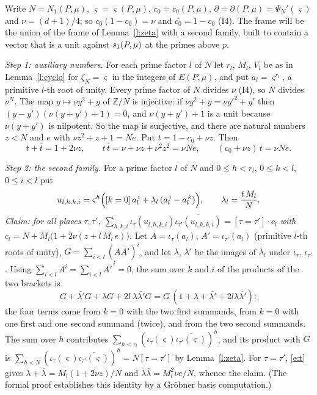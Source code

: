 \documentclass[11pt,a4paper]{article}
\makeatletter
\newcommand{\Z}{\mathbb{Z}}
\theoremstyle{plainx}
\theoremstyle{uprightx}
\renewenvironment{proof}[1][Proof]{\par\pushQED{\qed}\normalfont\topsep0pt\partopsep0pt
  \trivlist\item[\hskip\labelsep\itshape #1.]\ignorespaces}{\popQED\endtrivlist\@endpefalse}
\newcommand{\cj}[1]{\overline{#1}}
\newcommand{\EP}[2]{E(#1,#2)}
\newcommand{\Nn}[2]{N_1(#1,#2)}
\newcommand{\emb}[1]{\iota_{#1}}
\newcommand{\dgen}[2]{\partial(#1,#2)}
\newcommand{\rtu}[2]{\varsigma(#1,#2)}
\newcommand{\czE}[2]{c_0(#1,#2)}
\makeatother
\begin{document}
\begin{proof}[Proof of Theorem A]
Write $N=\Nn{P}{\mu}$, $\varsigma=\rtu{P}{\mu}$, $c_0=\czE{P}{\mu}$, $\partial=\dgen{P}{\mu}=\Psi_N'(\varsigma)$ and
$\nu=(d+1)/4$; so $c_0(1-c_0)=\nu$ and $\cj{c_0}=1-c_0$ (I4). The frame will be the union of the frame of
Lemma~\ref{l:zeta} with a second family, built to contain a vector that is a unit against $s_1(P,\mu)$ at the
primes above $p$.

\emph{Step 1: auxiliary numbers.} For each prime factor $l$ of $N$ let $r_l$, $M_l$, $V_l$ be as in
Lemma~\ref{l:cyclo} for $\zeta_N=\varsigma$ in the integers of $\EP{P}{\mu}$, and put $a_l=\varsigma^{r_l}$, a
primitive $l$-th root of unity. Every prime factor of $N$ divides $\nu$ (I4), so $N$ divides $\nu^N$. The map
$y\mapsto\nu y^2+y$ of $\Z/N$ is injective: if $\nu y^2+y=\nu y'^2+y'$ then $(y-y')(\nu(y+y')+1)=0$, and
$\nu(y+y')+1$ is a unit because $\nu(y+y')$ is nilpotent. So the map is surjective, and there are natural
numbers $z<N$ and $e$ with $\nu z^2+z+1=Ne$. Put $t=1-c_0+\nu z$. Then
\begin{equation}\label{e:t}
t+\cj t=1+2\nu z,\qquad t\,\cj t=\nu+\nu z+\nu^2z^2=\nu Ne,\qquad (c_0+\nu z)\,t=\nu Ne .
\end{equation}

\emph{Step 2: the second family.} For a prime factor $l$ of $N$ and $0\le h<r_l$, $0\le k<l$, $0\le i<l$ put
\[u_{l,h,k,i}=\varsigma^{h}\Bigl([k=0]\,a_l^{\,i}+\lambda_l\,(a_l^{\,i}-a_l^{\,k})\Bigr),\qquad\lambda_l=\frac{t\,M_l}{N} .\]
\emph{Claim: for all places $\tau,\tau'$,
$\sum_{h,k,i}\emb{\tau}(u_{l,h,k,i})\cj{\emb{\tau'}(u_{l,h,k,i})}=[\tau=\tau']\cdot c_l$ with
$c_l=N+M_l\bigl(1+2\nu(z+l\,M_l\,e)\bigr)$.} Let $A=\emb{\tau}(a_l)$, $A'=\emb{\tau'}(a_l)$ (primitive $l$-th roots of unity),
$G=\sum_{i<l}(A\cj{A'})^i$, and let $\lambda$, $\lambda'$ be the images of $\lambda_l$ under $\emb{\tau}$, $\emb{\tau'}$.
Using $\sum_{i<l}A^i=\sum_{i<l}\cj{A'}^{\,i}=0$, the sum over $k$ and $i$ of the products of the two brackets is
\[G+\cj{\lambda'}G+\lambda G+2l\,\lambda\cj{\lambda'}G=G\,(1+\lambda+\cj{\lambda'}+2l\lambda\cj{\lambda'}) :\]
the four terms come from $k=0$ with the two first summands, from $k=0$ with one first and one second summand
(twice), and from the two second summands. The sum over $h$ contributes
$\sum_{h<r_l}(\emb{\tau}(\varsigma)\cj{\emb{\tau'}(\varsigma)})^h$, and its product with $G$ is
$\sum_{h<N}(\emb{\tau}(\varsigma)\cj{\emb{\tau'}(\varsigma)})^h=N[\tau=\tau']$ by Lemma~\ref{l:zeta}. For $\tau=\tau'$,
\eqref{e:t} gives $\lambda+\cj\lambda=M_l(1+2\nu z)/N$ and $\lambda\cj\lambda=M_l^2\nu e/N$, whence the claim.
(The formal proof establishes this identity by a Gröbner basis computation.)


\end{proof}
\end{document}
